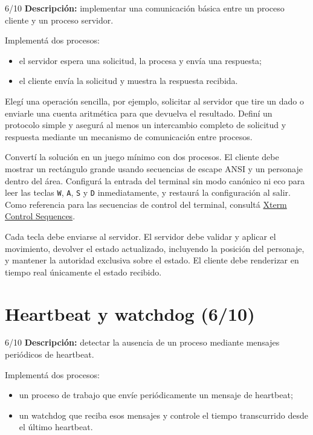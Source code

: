 \documentclass[11pt,a4paper]{article}
\begin{document}
\begin{trackbox}{6/10}
\textbf{Descripción:} implementar una comunicación básica entre un proceso
cliente y un proceso servidor.
\end{trackbox}

Implementá dos procesos:

\begin{itemize}
  \item el servidor espera una solicitud, la procesa y envía una respuesta;
  \item el cliente envía la solicitud y muestra la respuesta recibida.
\end{itemize}

Elegí una operación sencilla, por ejemplo, solicitar al servidor que tire un
dado o enviarle una cuenta aritmética para que devuelva el resultado. Definí
un protocolo simple y asegurá al menos un intercambio completo de solicitud y
respuesta mediante un mecanismo de comunicación entre procesos.

\begin{bonusbox}
Convertí la solución en un juego mínimo con dos procesos. El cliente debe
mostrar un rectángulo grande usando secuencias de escape ANSI y un personaje
dentro del área. Configurá la entrada del terminal sin modo canónico ni eco
para leer las teclas \texttt{W}, \texttt{A}, \texttt{S} y \texttt{D}
inmediatamente, y restaurá la configuración al salir.
Como referencia para las secuencias de control del terminal, consultá
\href{https://www.xfree86.org/current/ctlseqs.html}{Xterm Control Sequences}.

Cada tecla debe enviarse al servidor. El servidor debe validar y aplicar el
movimiento, devolver el estado actualizado, incluyendo la posición del
personaje, y mantener la autoridad exclusiva sobre el estado. El cliente debe
renderizar en tiempo real únicamente el estado recibido.
\end{bonusbox}

\newpage
\section{Heartbeat y watchdog (6/10)}

\begin{trackbox}{6/10}
\textbf{Descripción:} detectar la ausencia de un proceso mediante mensajes
periódicos de heartbeat.
\end{trackbox}

Implementá dos procesos:

\begin{itemize}
  \item un proceso de trabajo que envíe periódicamente un mensaje de heartbeat;
  \item un watchdog que reciba esos mensajes y controle el tiempo transcurrido
  desde el último heartbeat.
\end{itemize}
\end{document}

